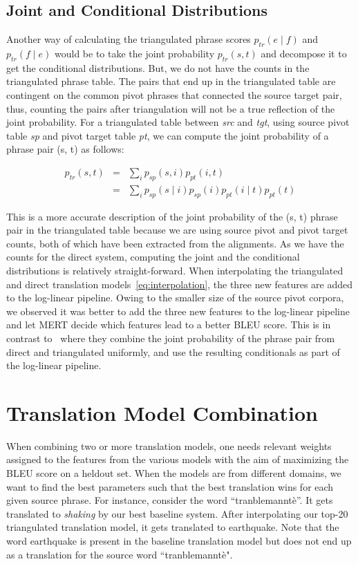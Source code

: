 \subsection{Joint and Conditional Distributions}
\label{subsec:joint}

Another way of calculating the triangulated phrase scores $p_{tr}(e \mid f)$ and $p_{tr}(f \mid e)$ would be to take the joint probability $p_{tr}(s, t)$ and decompose it to get the conditional distributions. But, we do not have the counts in the triangulated phrase table. The pairs that end up in the triangulated table are contingent on the common pivot phrases that connected the source target pair, thus, counting the pairs after triangulation will not be a true reflection of the joint probability. For a triangulated table between \emph{src} and \emph{tgt}, using source pivot table \emph{sp} and pivot target table \emph{pt}, we can compute the joint probability of a phrase pair (s, t) as follows:

        \begin{eqnarray*}
                p_{tr}(s, t) &=& \sum_{i}p_{sp}(s, i) p_{pt}(i, t) \\
                                &=& \sum_{i}p_{sp}(s \mid i) p_{sp}(i) p_{pt}(i \mid t) p_{pt}(t)
        \end{eqnarray*}


This is a more accurate description of the joint probability of the (s, t) phrase pair in the triangulated table because we are using source pivot and pivot target counts, both of which have been extracted from the alignments. As we have the counts for the direct system, computing the joint and the conditional distributions is relatively straight-forward. When interpolating the triangulated and direct translation models~\eqref{eq:interpolation}, the three new features are added to the log-linear pipeline. Owing to the smaller size of the source pivot corpora, we observed it was better to add the three new features to the log-linear pipeline and let MERT decide which features lead to a better BLEU score. This is in contrast to~\cite{Cohn:07} where they combine the joint probability of the phrase pair from direct and triangulated uniformly, and use the resulting conditionals as part of the log-linear pipeline.


\section{Translation Model Combination}
\label{sec:interpolation}
        When combining two or more translation models, one needs relevant weights assigned to the features from the various models with the aim of maximizing the BLEU score on a heldout set. When the models are from different domains, we want to find the best parameters such that the best translation wins for each given source phrase. For instance, consider the word ``tranblemannt\`e''. It gets translated to \emph{shaking} by our best baseline system. After interpolating our top-20 triangulated translation model, it gets translated to earthquake. Note that the word earthquake is present in the baseline translation model but does not end up as a translation for the source word ``tranblemannt\`e".

